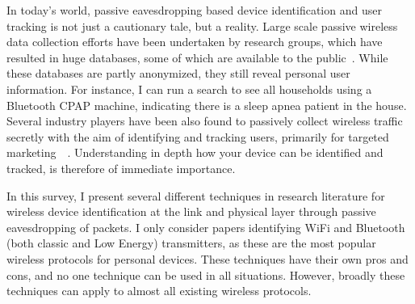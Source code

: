 In today's world, passive eavesdropping based device identification and user tracking is not just a cautionary tale, but a reality.
%
Large scale passive wireless data collection efforts have been undertaken by research groups, which have resulted in huge databases, some of which are available to the public~\cite{sigcomm2004,sapienza2013,wigle}. 
%
While these databases are partly anonymized, they still reveal personal user information. For instance, I can run a search to see all households using a Bluetooth CPAP machine, indicating there is a sleep apnea patient in the house.
%
Several industry players have been also found to passively collect wireless traffic secretly with the aim of identifying and tracking users, primarily for targeted marketing~\cite{londontraintracking,nytimesstoretracking,googlewifi,googleble}~. 
%
Understanding in depth how your device can be identified and tracked, is therefore of immediate importance.

\begin{comment}
Standards organizations have understood the potential privacy leakage and incorporated measures to protect privacy. Encryption techniques exist to protect information in active data connections. Unfortunately these security mechanisms only protect information in layer 3 and above. Link layer headers are still transmitted in the clear. More than that, there is a whole class of transmission - device discovery mechanisms that devices use to find each other and are therefore needed to be transmitted in the clear. 

To protect MAC address transmission in clear, MAC randomization methods were introduced. However, a number of papers have still managed to create identfying features from the various fields available in these device discovery packets. In the case of physical layer, just the mere presence of transmissions is enough to extract features for identifying these devices.
\end{comment}
In this survey, I present several different techniques in research literature for wireless device identification at the link and physical layer through passive eavesdropping of packets. 
%
I only consider papers identifying WiFi and Bluetooth (both classic and Low Energy) transmitters, as these are the most popular wireless protocols for personal devices. 
%
These techniques have their own pros and cons, and no one technique can be used in all situations. 
%
However, broadly these techniques can apply to almost all existing wireless protocols.

